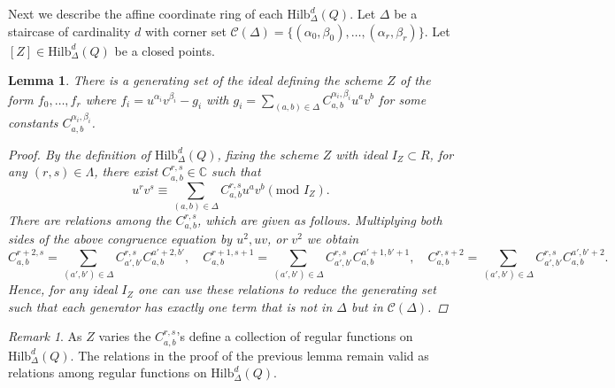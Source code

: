 \documentclass{amsart}[12pt]
\newtheorem{lemma}[theorem]{Lemma}
\theoremstyle{definition}
\theoremstyle{remark}
\newtheorem{rmk}[theorem]{Remark}
\numberwithin{equation}{section}
\begin{document}
Next we describe the affine coordinate ring of each $\mathrm{Hilb}^d_{\Delta}(Q)$. Let $\Delta$ be a staircase of cardinality $d$ with corner set $\mathcal{C}(\Delta) = \{(\alpha_0, \beta_0), \dots, (\alpha_r, \beta_r)\}$. Let $[Z] \in \mathrm{Hilb}^d_{\Delta}(Q)$ be a closed points.

\begin{lemma}\label{coordinate system}
There is a generating set of the ideal defining the scheme $Z$ of the form $f_0, \dots, f_r$ where $f_i = u^{\alpha_i}v^{\beta_i} - g_i$ with $g_i = \sum_{(a, b) \in \Delta}C_{a, b}^{\alpha_i, \beta_i}u^av^b$ for some constants $C_{a, b}^{\alpha_i, \beta_i}$.
\begin{proof}
By the definition of $\mathrm{Hilb}^d_{\Delta}(Q)$, fixing the scheme $Z$ with ideal $I_Z \subset R$, for any $(r, s) \in \Lambda$, there exist $C^{r, s}_{a, b} \in \mathbb{C}$ such that
\[
u^rv^s \equiv \sum_{(a, b) \in \Delta}C^{r, s}_{a, b}u^av^b (\textrm{mod } I_Z).
\]
There are relations among the $C^{r, s}_{a, b}$, which are given as follows. Multiplying both sides of the above congruence equation by $u^2, uv$, or $v^2$ we obtain
\begin{equation*}
C^{r + 2, s}_{a, b} = \sum_{(a', b') \in \Delta} C^{r, s}_{a', b'}C^{a' + 2, b'}_{a, b}, \quad C^{r + 1, s + 1}_{a, b} = \sum_{(a', b') \in \Delta} C^{r, s}_{a', b'}C^{a' + 1, b' + 1}_{a, b},
\quad C^{r, s+ 2}_{a, b} = \sum_{(a', b') \in \Delta} C^{r, s}_{a', b'}C^{a', b' + 2}_{a, b}.
\end{equation*}
Hence, for any ideal $I_Z$ one can use these relations to reduce the generating set such that each generator has exactly one term that is not in $\Delta$ but in $\mathcal{C}(\Delta)$.
\end{proof}
\end{lemma}

\begin{rmk}
As $Z$ varies the $C^{r, s}_{a, b}$'s define a collection of regular functions on $\mathrm{Hilb}^d_{\Delta}(Q)$. The relations in the proof of the previous lemma remain valid as relations among regular functions on $\mathrm{Hilb}^d_{\Delta}(Q)$.
\end{rmk}
\end{document}
